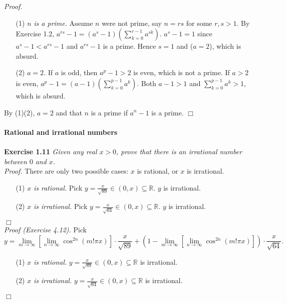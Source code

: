 \documentclass{article}
\begin{document}
\emph{Proof.}
\begin{enumerate}
\item[(1)]
\emph{$n$ is a prime.}
Assume $n$ were not prime, say $n = rs$ for some $r, s > 1$.
By Exercise 1.2,
$a^{rs} - 1 = (a^s - 1)(\sum_{k=0}^{r-1} a^{sk})$.
$a^s - 1 = 1$ since $a^s - 1 < a^{rs} - 1$ and $a^{rs} - 1$ is a prime.
Hence $s=1$ and ($a=2$), which is absurd.
\item[(2)]
\emph{$a = 2$.}
If $a$ is odd, then $a^p - 1 > 2$ is even, which is not a prime.
If $a > 2$ is even,
$a^p - 1 = (a - 1)(\sum_{k=0}^{p-1} a^k)$.
Both $a - 1 > 1$ and $\sum_{k=0}^{p-1} a^k > 1$, which is absurd.
\end{enumerate}
By (1)(2), $a = 2$ and that $n$ is a prime if $a^n - 1$ is a prime.
$\Box$ \\\\



\textbf{\large Rational and irrational numbers} \\\\



\textbf{Exercise 1.11}
\emph{Given any real $x > 0$,
prove that there is an irrational number between $0$ and $x$.} \\

\emph{Proof.}
There are only two possible cases: $x$ is rational, or $x$ is irrational.
\begin{enumerate}
\item[(1)]
\emph{$x$ is rational.}
Pick $y = \frac{x}{\sqrt{89}} \in (0, x) \subseteq \mathbb{R}$. $y$ is irrational.
\item[(2)]
\emph{$x$ is irrational.}
Pick $y = \frac{x}{\sqrt{64}} \in (0, x) \subseteq \mathbb{R}$. $y$ is irrational.
\end{enumerate}
$\Box$ \\

\emph{Proof (Exercise 4.12).}
Pick
$$y
= \lim_{m \rightarrow \infty}[\lim_{n \rightarrow \infty} \cos^{2n}(m!\pi x)]
\cdot \frac{x}{\sqrt{89}}
+
(1 - \lim_{m \rightarrow \infty}[\lim_{n \rightarrow \infty} \cos^{2n}(m!\pi x)])
\cdot \frac{x}{\sqrt{64}}.$$
\begin{enumerate}
\item[(1)]
\emph{$x$ is rational.}
$y = \frac{x}{\sqrt{89}} \in (0, x) \subseteq \mathbb{R}$ is irrational.
\item[(2)]
\emph{$x$ is irrational.}
$y = \frac{x}{\sqrt{64}} \in (0, x) \subseteq \mathbb{R}$ is irrational.
\end{enumerate}
$\Box$ \\\\
\end{document}
